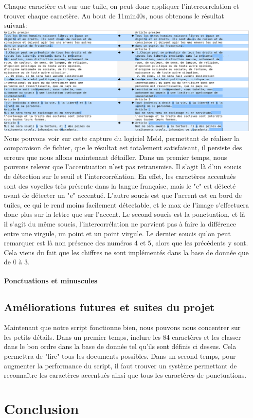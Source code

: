\documentclass[a4paper,12pt,titlepage]{report}
\begin{document}
	Chaque caractère est sur une tuile, on peut donc appliquer l'intercorrelation et trouver chaque caractère.
	Au bout de 11min40s, nous obtenons le résultat suivant:
	\includegraphics[scale=0.25]{../illus/diffDUDH.png}
	Nous pouvons voir sur cette capture du logiciel Meld, permettant de réaliser la comparaison de fichier, que le résultat est totalement satisfaisant, il persiste des erreurs que nous allons maintenant détailler.
	Dans un premier temps, nous pouvons relever que l'accentuation n'est pas retransmise. Il s'agit là d'un soucis de détection sur le seuil et l'intercorrélation. En effet, les caractères accentués sont des voyelles très présente dans la langue française, mais le "e" est détecté avant de détecter un "e" accentué. L'autre soucis est que l'accent est en bord de tuiles, ce qui le rend moins facilement détectable, et le max de l'image s'effectuera donc plus sur la lettre que sur l'accent.
	Le second soucis est la ponctuation, et là il s'agit du même soucis, l'intercorrélation ne parvient pas à faire la différence entre une virgule, un point et un point virgule.
	Le dernier soucis qu'on peut remarquer est là non présence des numéros 4 et 5, alors que les précédents y sont. Cela viens du fait que les chiffres ne sont implémentés dans la base de donnée que de 0 à 3.
	
	\paragraph{Ponctuations et minuscules}
	\subsection{Améliorations futures et suites du projet}	
	Maintenant que notre script fonctionne bien, nous pouvons nous concentrer sur les petits détails. Dans un premier temps, inclure les 84 caractères et les classer dans le bon ordre dans la base de donnée tel qu'ils sont définis ci dessus. Cela permettra de "lire" tous les documents possibles. Dans un second temps, pour augmenter la performance du script, il faut trouver un système permettant de reconnaître les caractères accentués ainsi que tous les caractères de ponctuations.
	\section{Conclusion}
	
\end{document}
